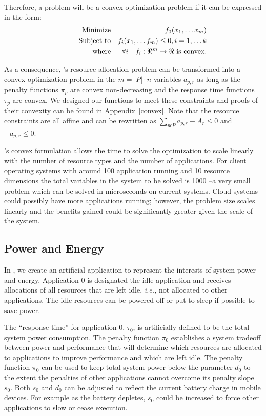 Therefore, a problem will be a convex optimization problem if it can be expressed in the form:
\begin{eqnarray*}
& \makebox[1in][r]{Minimize}   & f_0(x_1,\ldots x_m)                              \\
& \makebox[1in][r]{Subject to} & f_i(x_1,\ldots f_m) \leq 0, i = 1,\ldots k        \\
& \makebox[1in][r]{where}      & \forall i \quad f_i:\Re^m \rightarrow \Re \mbox{ is convex.}
\end{eqnarray*}


As a consequence, \pacora's resource allocation problem can be transformed into a convex optimization problem in the $m = |P|\cdot n$ variables $a_{p,r}$ as long as the penalty functions $\pi_p$ are convex non-decreasing and the response time functions $\tau_p$ are convex.  We designed our functions to meet these constraints and proofs of their convexity can be found in Appendix~\ref{convex}. Note that the resource constraints are all affine and can be rewritten as
$\sum_{p\epsilon P} a_{p,r} - A_r \leq 0$ and $-a_{p,r} \leq 0$.

\pacora's convex formulation allows the time to solve the optimization to scale linearly with the number of resource types and the number of applications.   For client operating systems with around 100 application running and 10 resource dimensions the total variables in the system to be solved is 1000 --a very small problem which can be solved in microseconds on current systems.   Cloud systems could possibly have more applications running; however, the problem size scales linearly and the benefits gained could be significantly greater given the scale of the system.

\subsection*{Power and Energy}    

In \pacora, we create an artificial application to represent the interests of system power and energy.  Application 0 is designated the idle application and receives allocations of all resources
that are left idle, \emph{i.e.,} not allocated to other applications.   The idle resources can be powered off or put to sleep if possible to save power.

The ``response time'' for application 0, $\tau_0$, is artificially defined to be the total system power consumption. 
The penalty function $\pi_0$ establishes a system tradeoff between power and performance that
will determine which resources are allocated to applications to improve performance and which are left idle.
The penalty function $\pi_0$ can be used to keep total system power below the parameter $d_0$
to the extent the penalties of other applications cannot overcome its penalty slope $s_0$. Both $s_0$ and $d_0$ can be adjusted to reflect the current battery charge in mobile devices. For example as the battery depletes, $s_0$ could be increased to force other applications to slow or cease execution.

